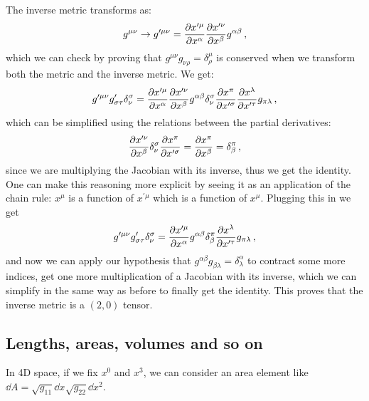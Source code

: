 \documentclass[main.tex]{subfiles}
\begin{document}
The inverse metric transforms as: 
%
\begin{equation}
  g^{\mu \nu } \rightarrow
  g^{\prime \mu \nu } =
  \pdv{x^{\prime \mu  }}{x^{\alpha  }} 
  \pdv{x^{\prime \nu   }}{x^{\beta }}
  g^{\alpha \beta } 
\,,
\end{equation}
%
which we can check by proving that \(g^{\mu \nu }g_{\nu \rho  } = \delta^{\mu }_{\rho }\) is conserved when we transform both the metric and the inverse metric. We get: 
%
\begin{equation}
    g^{\prime \mu \nu } g_{\sigma \tau  }' \delta_{\nu }^{\sigma } =
    \pdv{x^{\prime \mu  }}{x^{\alpha  }} 
    \pdv{x^{\prime \nu   }}{x^{\beta }}
    g^{\alpha \beta } 
    \delta_{\nu }^{\sigma }
    \pdv{x^{ \pi  }}{x^{\prime \sigma  }} 
    \pdv{x^{ \lambda   }}{x^{\prime \tau  }} 
    g_{\pi  \lambda  }
\,,
\end{equation}
%
which can be simplified using the relations between the partial derivatives: 
%
\begin{equation}
    \pdv{x^{\prime \nu   }}{x^{\beta }}
    \delta_{\nu }^{\sigma }
    \pdv{x^{ \pi  }}{x^{\prime \sigma  }} 
    = \pdv{x^{\pi }}{x^{\beta }}
    = \delta^{\pi }_{\beta }
\,,
\end{equation}
%
since we are multiplying the Jacobian with its inverse, thus we get the identity. One can make this reasoning more explicit by seeing it as an application of the chain rule: \(x^{\mu }\) is a function of \(x^{\prime \mu }\) which is a function of \(x^{\mu } \).
Plugging this in we get 
%
\begin{equation}
    g^{\prime \mu \nu } g_{\sigma \tau  }' \delta_{\nu }^{\sigma } =
    \pdv{x^{\prime \mu  }}{x^{\alpha  }} 
    g^{\alpha \beta } 
    \delta^{\pi }_{\beta }
    \pdv{x^{ \lambda   }}{x^{\prime \tau  }} 
    g_{\pi  \lambda  }
\,,
\end{equation}
%
and now we can apply our hypothesis that \(g^{\alpha \beta }g_{\beta \lambda } = \delta^{\alpha }_{\lambda }\) to contract some more indices, get one more multiplication of a Jacobian with its inverse, which we can simplify in the same way as before to finally get the identity.
This proves that the inverse metric is a \((2,0)\) tensor.

\subsection{Lengths, areas, volumes and so on}

In 4D space, if we fix \(x^{0}\) and \(x^{3}\), we can consider an area element like \(\dd{A} = \sqrt{g_{11}} \dd{x^{}} \sqrt{g_{22}} \dd{x^{2}} \).
\end{document}
